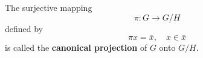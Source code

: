The surjective mapping
$$\pi: G \rightarrow G/H$$
defined by
$$\pi x = \bar{x}, \quad x \in \bar{x}$$
is called the \textbf{canonical projection} of $G$ onto $G/H$.
